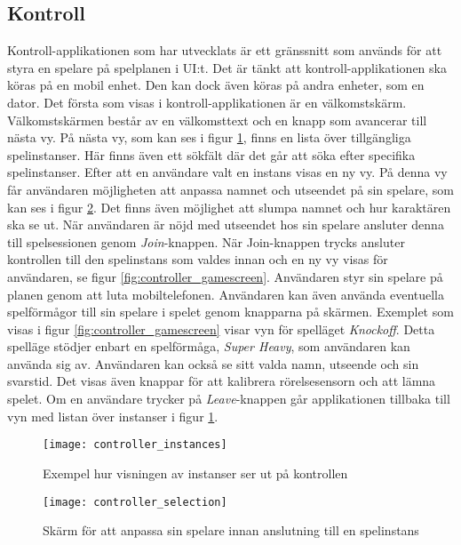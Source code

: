 \subsection{Kontroll}
Kontroll-applikationen som har utvecklats är ett gränssnitt som används för att styra en spelare på spelplanen i UI:t. Det är tänkt att kontroll-applikationen ska köras på en mobil enhet. Den kan dock även köras på andra enheter, som en dator. Det första som visas i kontroll-applikationen är en välkomstskärm. Välkomstskärmen består av en välkomsttext och en knapp som avancerar till nästa vy. På nästa vy, som kan ses i figur \ref{fig:controller_instances}, finns en lista över tillgängliga spelinstanser. Här finns även ett sökfält där det går att söka efter specifika spelinstanser. Efter att en användare valt en instans visas en ny vy. På denna vy får användaren möjligheten att anpassa namnet och utseendet på sin spelare, som kan ses i figur \ref{fig:controller_selection}. Det finns även möjlighet att slumpa namnet och hur karaktären ska se ut. När användaren är nöjd med utseendet hos sin spelare ansluter denna till spelsessionen genom \textit{Join}-knappen. När Join-knappen trycks ansluter kontrollen till den spelinstans som valdes innan och en ny vy visas för användaren, se figur \ref{fig:controller_gamescreen}. Användaren styr sin spelare på planen genom att luta mobiltelefonen. Användaren kan även använda eventuella spelförmågor till sin spelare i spelet genom knapparna på skärmen. Exemplet som visas i figur \ref{fig:controller_gamescreen} visar vyn för spelläget \textit{Knockoff}. Detta spelläge stödjer enbart en spelförmåga, \textit{Super Heavy}, som användaren kan använda sig av. Användaren kan också se sitt valda namn, utseende och sin svarstid. Det visas även knappar för att kalibrera rörelsesensorn och att lämna spelet. Om en användare trycker på \textit{Leave}-knappen går applikationen tillbaka till vyn med listan över instanser i figur \ref{fig:controller_instances}.

\begin{figure}[h]
    \centering
    \texttt{[image: controller\_instances]}
    \caption{Exempel hur visningen av instanser ser ut på kontrollen}
    \label{fig:controller_instances}
\end{figure}

\begin{figure}[H]
    \centering
    \texttt{[image: controller\_selection]}
    \caption{Skärm för att anpassa sin spelare innan anslutning till en spelinstans}
    \label{fig:controller_selection}
\end{figure}

